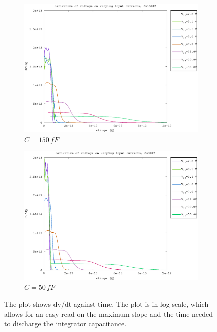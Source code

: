 \documentclass{article}
\begin{document}
\begin{figure}[h]
\begin{subfigure}[b]{0.475\textwidth}
	    \centering 
	    \includegraphics[width=\textwidth]{fig/bre_d_slope_150fF.eps}
	    \caption[]%
	    {$C=150\,fF$}    
	    \label{fig:bre_d_slopes_150fF}
	\end{subfigure}
	\quad
	\begin{subfigure}[b]{0.475\textwidth}   
	    \centering 
	    \includegraphics[width=\textwidth]{fig/bre_d_slope_50fF.eps}
	    \caption[]%
	    {$C=50\,fF$}    
	    \label{fig:bre_d_slopes_50fF}
	\end{subfigure}
	\caption{The plot shows dv/dt against time. The plot is in log scale, which allows for an easy read on the maximum slope and the time needed to discharge the integrator capacitance. }
	\label{fig:bre_d_slopes}
\end{figure}
\end{document}

